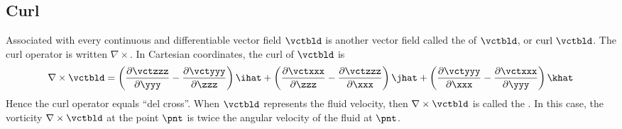 \documentclass[12pt,twoside]{book}
\begin{document}
\subsection[Curl]{Curl}\label{sxn:crl_crt}
Associated with every continuous and differentiable vector field
$\vctbld$ is another vector field called the  of
$\vctbld$, or $\mathrm{curl}\ \vctbld$.
The $\mathrm{curl}$ operator is written $\nabla \times$.
In Cartesian coordinates, the curl of $\vctbld$ is 
\begin{equation}
\nabla \times \vctbld = 
\left( \frac{\partial \vctzzz}{\partial \yyy} - 
\frac{\partial \vctyyy}{\partial \zzz} \right) \ihat + 
\left( \frac{\partial \vctxxx}{\partial \zzz} - 
\frac{\partial \vctzzz}{\partial \xxx} \right) \jhat + 
\left( \frac{\partial \vctyyy}{\partial \xxx} - 
\frac{\partial \vctxxx}{\partial \yyy} \right) \khat
\label{eqn:crl_crt}
\end{equation}
Hence the curl operator equals ``del cross''.
When $\vctbld$ represents the fluid velocity, then 
$\nabla \times \vctbld$ is called the .
In this case, the vorticity $\nabla \times \vctbld$ at the point
$\pnt$ is twice the angular velocity of the fluid at $\pnt$.
\end{document}
